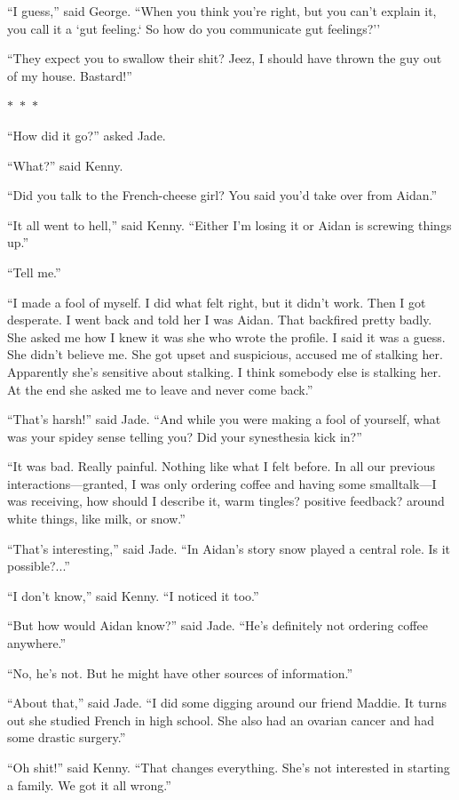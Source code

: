 \documentclass{memoir}
\newcommand{\starbreak}{%
\begin{center}
  $\ast$~$\ast$~$\ast$
\end{center}
}
\begin{document}
``I guess,'' said George. ``When you think you're right, but you can't explain it, you call it a `gut feeling.` So how do you communicate gut feelings?''

``They expect you to swallow their shit? Jeez, I should have thrown the guy out of my house. Bastard!''


\starbreak

``How did it go?'' asked Jade.

``What?'' said Kenny.

``Did you talk to the French-cheese girl? You said you'd take over from Aidan.''

``It all went to hell,'' said Kenny. ``Either I'm losing it or Aidan is screwing things up.''

``Tell me.''

``I made a fool of myself. I did what felt right, but it didn't work. Then I got desperate. I went back and told her I was Aidan. That backfired pretty badly. She asked me how I knew it was she who wrote the profile. I said it was a guess. She didn't believe me. She got upset and suspicious, accused me of stalking her. Apparently she's sensitive about stalking. I think somebody else is stalking her. At the end she asked me to leave and never come back.''

``That's harsh!'' said Jade. ``And while you were making a fool of yourself, what was your spidey sense telling you? Did your synesthesia kick in?''

``It was bad. Really painful. Nothing like what I felt before. In all our previous interactions---granted, I was only ordering coffee and having some smalltalk---I was receiving, how should I describe it, warm tingles? positive feedback? around white things, like milk, or snow.''

``That's interesting,'' said Jade. ``In Aidan's story snow played a central role. Is it possible?...''

``I don't know,'' said Kenny. ``I noticed it too.''

``But how would Aidan know?'' said Jade. ``He's definitely not ordering coffee anywhere.''

``No, he's not. But he might have other sources of information.''

``About that,'' said Jade. ``I did some digging around our friend Maddie. It turns out she studied French in high school. She also had an ovarian cancer and had some drastic surgery.''

``Oh shit!'' said Kenny. ``That changes everything. She's not interested in starting a family. We got it all wrong.''
\end{document}
